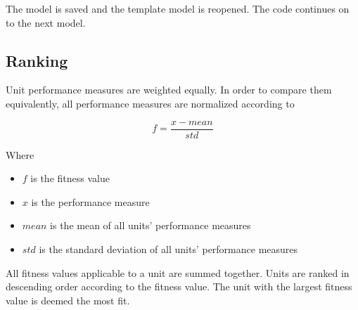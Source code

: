 The model is saved and the template model is reopened. The code continues on to the next model.

\subsection{Ranking}
\label{ssec:rank}

Unit performance measures are weighted equally. In order to compare them equivalently, all performance measures are normalized according to

\begin{equation}
	f=\frac{x-mean}{std}
\end{equation}

Where

\begin{itemize}
	\item $f$ is the fitness value
	\item $x$ is the performance measure
	\item $mean$ is the mean of all units' performance measures
	\item $std$ is the standard deviation of all units' performance measures
\end{itemize}

All fitness values applicable to a unit are summed together. Units are ranked in descending order according to the fitness value. The unit with the largest fitness value is deemed the most fit.
